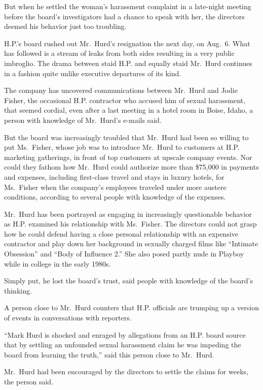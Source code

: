 ﻿\documentclass[12pt]{article}
\begin{document}
But when he settled the woman's harassment complaint in a late-night meeting before the board's
investigators had a chance to speak with her, the directors deemed his behavior just too troubling.

H.P.'s board rushed out Mr.~Hurd's resignation the next day, on Aug.~6. What has followed is a
stream of leaks from both sides resulting in a very public imbroglio. The drama between staid H.P.
and equally staid Mr.~Hurd continues in a fashion quite unlike executive departures of its kind.

The company has uncovered communications between Mr.~Hurd and Jodie Fisher, the occasional H.P.
contractor who accused him of sexual harassment, that seemed cordial, even after a last meeting in a
hotel room in Boise, Idaho, a person with knowledge of Mr.~Hurd's e-mails said.

But the board was increasingly troubled that Mr.~Hurd had been so willing to put Ms.~Fisher, whose
job was to introduce Mr.~Hurd to customers at H.P. marketing gatherings, in front of top customers
at upscale company events. Nor could they fathom how Mr.~Hurd could authorize more than \$75,000 in
payments and expenses, including first-class travel and stays in luxury hotels, for Ms.~Fisher when
the company's employees traveled under more austere conditions, according to several people with
knowledge of the expenses.

Mr.~Hurd has been portrayed as engaging in increasingly questionable behavior as H.P. examined his
relationship with Ms.~Fisher. The directors could not grasp how he could defend having a close
personal relationship with an expensive contractor and play down her background in sexually charged
films like ``Intimate Obsession'' and ``Body of Influence 2.'' She also posed partly nude in Playboy
while in college in the early 1980s.

Simply put, he lost the board's trust, said people with knowledge of the board's thinking.

A person close to Mr.~Hurd counters that H.P. officials are trumping up a version of events in
conversations with reporters.

``Mark Hurd is shocked and enraged by allegations from an H.P. board source that by settling an
unfounded sexual harassment claim he was impeding the board from learning the truth,'' said this
person close to Mr.~Hurd.

Mr.~Hurd had been encouraged by the directors to settle the claims for weeks, the person said.
\end{document}
